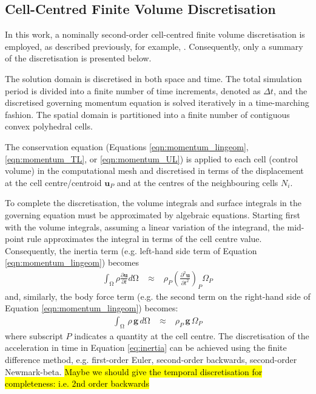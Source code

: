 \documentclass[sn-mathphys,Numbered]{sn-jnl}%
\newcommand{\bb}{\boldsymbol}
\begin{document}
\subsection{Cell-Centred Finite Volume Discretisation}
\label{sec:discretisation}
In this work, a nominally second-order cell-centred finite volume discretisation is employed, as described previously, for example, \citep{Cardiff2017, batistic2022, tukovic2013, jasak2000}.
Consequently, only a summary of the discretisation is presented below.

The solution domain is discretised in both space and time.
The total simulation period is divided into a finite number of time increments, denoted as $\Delta t$, and the discretised governing momentum equation is solved iteratively in a time-marching fashion. The spatial domain is partitioned into a finite number of contiguous convex polyhedral cells.

The conservation equation (Equations \ref{eqn:momentum_lingeom}, \ref{eqn:momentum_TL}, or \ref{eqn:momentum_UL}) is applied to each cell (control volume) in the computational mesh and discretised in terms of the displacement at the cell centre/centroid $\bb{u}_P$ and at the centres of the neighbouring cells $N_i$.

To complete the discretisation, the volume integrals and surface integrals in the governing equation must be approximated by algebraic equations.
Starting first with the volume integrals, assuming a linear variation of the integrand, the mid-point rule approximates the integral in terms of the cell centre value.
Consequently, the inertia term (e.g. left-hand side term of Equation \ref{eqn:momentum_lingeom}) becomes
\begin{eqnarray} \label{eq:inertia}
	\int_{\mathrm{\Omega}} \rho \frac{\partial \bb{u} }{\partial t}  d\mathrm{\Omega}
	\;&\approx&\;
	\rho_P \left(\frac{\partial^2 \bb{u} }{\partial t^2}\right)_P  \Omega_P
\end{eqnarray}
and, similarly, the body force term (e.g. the second term on the right-hand side of Equation \ref{eqn:momentum_lingeom}) becomes:
\begin{eqnarray}
	\int_{\mathrm{\Omega}} \, \rho \, \bb{g} \,  d\mathrm{\Omega}
	\;&\approx&\;
	\rho_P \, \bb{g}\,  \Omega_P
\end{eqnarray}
where subscript $P$ indicates a quantity at the cell centre.
The discretisation of the acceleration in time in Equation \ref{eq:inertia} can be achieved using the finite difference method, e.g. first-order Euler, second-order backwards, second-order Newmark-beta.
\hl{Maybe we should give the temporal discretisation for completeness: i.e. 2nd order backwards}
\end{document}
